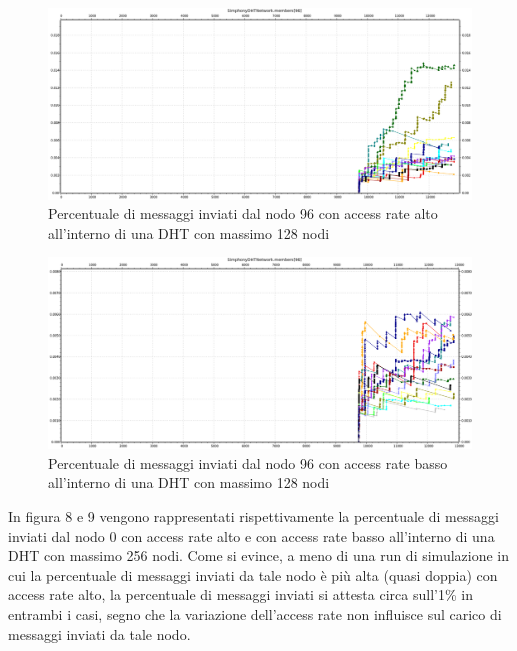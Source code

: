 \documentclass[	
	DIV=calc,
	paper=a4,
	fontsize=11pt,
	onecolumn
]{scrartcl} %
\begin{document}
	\begin{figure}[H]
		\centering
		\includegraphics[scale=0.35]	{SymphonyDHT/plots/PercentageOfMessagesSent/128_Nodes_FastAccess/SymphonyDHT_128Nodes_FastAccess_Node96.png}
		\caption{Percentuale di messaggi inviati dal nodo 96 con access rate alto all'interno di una DHT con massimo 128 nodi}
		\label{Figura 6}
	\end{figure}
	\begin{figure}[H]
		\centering
		\includegraphics[scale=0.35]	{SymphonyDHT/plots/PercentageOfMessagesSent/128_Nodes_SlowAccess/SymphonyDHT_128Nodes_SlowAccess_Node96.png}
		\caption{Percentuale di messaggi inviati dal nodo 96 con access rate basso all'interno di una DHT con massimo 128 nodi}
		\label{Figura 7}
	\end{figure}
		
	In figura 8 e 9 vengono rappresentati rispettivamente la percentuale di messaggi inviati dal nodo 0 con access rate alto e con access rate basso all'interno di una DHT con massimo 256 nodi. Come si evince, a meno di una run di simulazione in cui la percentuale di messaggi inviati da tale nodo è più alta (quasi doppia) con access rate alto, la percentuale di messaggi inviati si attesta circa sull'1\% in entrambi i casi, segno che la variazione dell'access rate non influisce sul carico di messaggi inviati da tale nodo.
	
\end{document}
